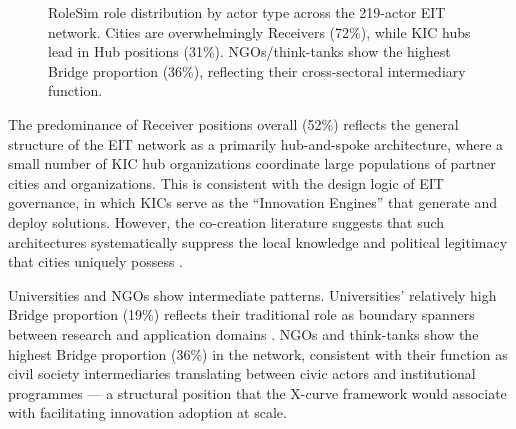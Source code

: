 \documentclass[review,12pt]{elsarticle}
\begin{document}
\begin{figure}[htbp]
\centering
{}
\caption{RoleSim role distribution by actor type across the 219-actor EIT network. Cities are overwhelmingly Receivers (72\%), while KIC hubs lead in Hub positions (31\%). NGOs/think-tanks show the highest Bridge proportion (36\%), reflecting their cross-sectoral intermediary function.}
\label{fig:role-dist}
\end{figure}

The predominance of Receiver positions overall (52\%) reflects the general structure of the EIT network as a primarily hub-and-spoke architecture, where a small number of KIC hub organizations coordinate large populations of partner cities and organizations. This is consistent with the design logic of EIT governance, in which KICs serve as the ``Innovation Engines'' that generate and deploy solutions. However, the co-creation literature suggests that such architectures systematically suppress the local knowledge and political legitimacy that cities uniquely possess \citep{torfing2019co}.

Universities and NGOs show intermediate patterns. Universities' relatively high Bridge proportion (19\%) reflects their traditional role as boundary spanners between research and application domains \citep{etzkowitz2000dynamics}. NGOs and think-tanks show the highest Bridge proportion (36\%) in the network, consistent with their function as civil society intermediaries translating between civic actors and institutional programmes --- a structural position that the \citet{hebinck2023untapped} X-curve framework would associate with facilitating innovation adoption at scale.
\end{document}
